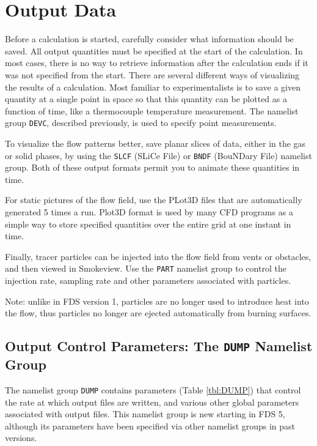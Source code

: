 \documentclass[11pt]{book}
\newcommand{\ct}{\tt\small}
\begin{document}
\chapter{Output Data}
\label{info:outputdata}
Before a calculation is started, carefully consider
what information should be saved. All output quantities must be specified
at the start of the calculation. In most cases, there is no way to
retrieve information after the calculation ends if it was not specified from the start.
There are several different ways of visualizing the results of a
calculation. Most familiar to
experimentalists is to save a given quantity at a single point in space so
that this quantity can be plotted as a function of time, like a
thermocouple temperature measurement. The namelist group {\ct DEVC},
described previously, is used to specify point measurements.

To visualize the flow patterns better, save planar
slices of data, either in the gas or solid phases, by using the
{\ct SLCF} (SLiCe File) or {\ct BNDF} (BouNDary File) namelist group.
Both of these output formats permit you to animate these quantities in
time.

For static pictures of the flow field, use the PLot3D files
that are automatically generated 5 times a run. Plot3D format is used by many CFD programs as a simple
way to store specified quantities over the entire grid at one instant in
time.

Finally, tracer particles can be injected into the flow field from
vents or obstacles, and then viewed in Smokeview. Use the {\ct PART}
namelist group to control the injection rate, sampling rate and other
parameters associated with particles.

\begin{warning}
\noindent
Note: unlike in FDS version 1,
particles are no longer used to introduce heat into the flow, thus
particles no longer are ejected automatically from burning surfaces.
\end{warning}


\section{Output Control Parameters: The \texorpdfstring{{\tt DUMP}}{DUMP} Namelist Group}
\label{info:DUMP}

The namelist group {\ct DUMP} contains parameters (Table \ref{tbl:DUMP}) that control the rate at which output files
are written, and various other global parameters associated with output files.
This namelist group is new starting in FDS 5, although its
parameters have been specified via other namelist groups in past versions.
\end{document}
